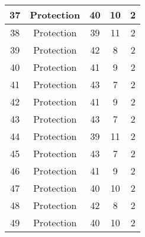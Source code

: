 \documentclass[results.tex]{subfiles}
\begin{document}
\begin{center}
\begin{tabular}{| c || c | c | c | c |}
            \hline
            37                      & Protection                   & 40                     & 10                      & 2                    \\
            \hline
            38                      & Protection                   & 39                     & 11                      & 2                    \\
            \hline
            39                      & Protection                   & 42                     & 8                       & 2                    \\
            \hline
            40                      & Protection                   & 41                     & 9                       & 2                    \\
            \hline
            41                      & Protection                   & 43                     & 7                       & 2                    \\
            \hline
            42                      & Protection                   & 41                     & 9                       & 2                    \\
            \hline
            43                      & Protection                   & 43                     & 7                       & 2                    \\
            \hline
            44                      & Protection                   & 39                     & 11                      & 2                    \\
            \hline
            45                      & Protection                   & 43                     & 7                       & 2                    \\
            \hline
            46                      & Protection                   & 41                     & 9                       & 2                    \\
            \hline
            47                      & Protection                   & 40                     & 10                      & 2                    \\
            \hline
            48                      & Protection                   & 42                     & 8                       & 2                    \\
            \hline
            49                      & Protection                   & 40                     & 10                      & 2                    \\
            \hline
        \end{tabular}
    \end{center}
\end{document}
